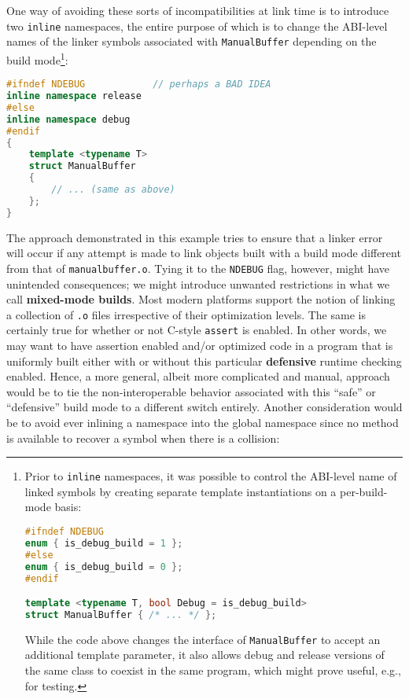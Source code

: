 One way of avoiding these sorts of incompatibilities at link time is to
introduce two \texttt{inline} namespaces, the entire purpose of which is
to change the ABI-level names of the linker symbols associated with
\texttt{ManualBuffer} depending on the build mode{\cprotect\footnote{Prior
to \texttt{inline} namespaces, it was possible to control the
ABI-level name of linked symbols by creating separate template
instantiations on a per-build-mode basis:

\begin{lstlisting}[language=C++, basicstyle={\ttfamily\footnotesize}]
#ifndef NDEBUG
enum { is_debug_build = 1 };
#else
enum { is_debug_build = 0 };
#endif

template <typename T, bool Debug = is_debug_build>
struct ManualBuffer { /* ... */ };
\end{lstlisting}

\noindent While the code above changes the interface of \texttt{ManualBuffer} to
accept an additional template parameter, it also allows debug and
release versions of the same class to coexist in the same program,
  which might prove useful, e.g., for testing.}}:

\begin{lstlisting}[language=C++]
#ifndef NDEBUG            // perhaps a BAD IDEA
inline namespace release
#else
inline namespace debug
#endif
{
    template <typename T>
    struct ManualBuffer
    {
        // ... (same as above)
    };
}
\end{lstlisting}

\noindent The approach demonstrated in this example tries to ensure that a linker
error will occur if any attempt is made to link objects built with a
build mode different from that of \mbox{\texttt{manualbuffer.o}}. Tying it to
the \texttt{NDEBUG} flag, however, might have unintended consequences;
we might introduce unwanted restrictions in what we call
\textbf{mixed-mode builds}. Most modern platforms support the notion of
linking a collection of \texttt{.o} files irrespective of their
optimization levels. The same is certainly true for whether or not
C-style \texttt{assert} is enabled. In other words, we may want to have
assertion enabled and/or optimized code in a program that is uniformly
built either with or without this particular \textbf{defensive} runtime
checking enabled. Hence, a more general, albeit more complicated and
manual, approach would be to tie the non-interoperable behavior
associated with this ``safe'' or ``defensive'' build mode to a different
switch entirely. Another consideration would be to avoid ever inlining a
namespace into the global namespace since no method is available to
recover a symbol when there is a collision:

